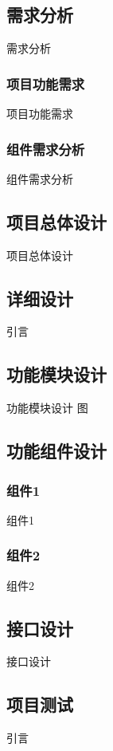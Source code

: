 \documentclass[twoside]{CUGThesis}
\begin{document}
	\subsection{需求分析}
	需求分析
		\subsubsection{项目功能需求}
		项目功能需求
		\subsubsection{组件需求分析}
		组件需求分析
	\subsection{项目总体设计}
	项目总体设计

\begin{spacing}{2}
	\section{详细设计}
\end{spacing}
引言
	\subsection{功能模块设计}
	功能模块设计
	图
	\subsection{功能组件设计}
		\subsubsection{组件1}
		组件1
		\subsubsection{组件2}
		组件2
	\subsection{接口设计}
	接口设计

\begin{spacing}{2}
	\section{项目测试}
\end{spacing}
引言
\end{document}
